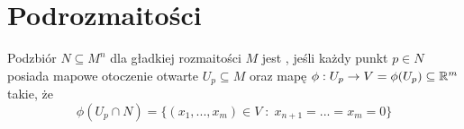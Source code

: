 \section{Podrozmaitości}

\begin{definition}
  Podzbiór $N\subseteq M^n$ dla gładkiej rozmaitości $M$ jest , jeśli każdy punkt $p\in N$ posiada mapowe otoczenie otwarte $U_p\subseteq M$ oraz mapę $\phi:U_p\to V=\phi(U_p)\subseteq\mathbb{R}^m$ takie, że
  $$\phi(U_p\cap N)=\{(x_1,...,x_m)\in V\;:\;x_{n+1}=...=x_m=0\}$$
\end{definition}

\begin{illustration}
  
\end{illustration}
